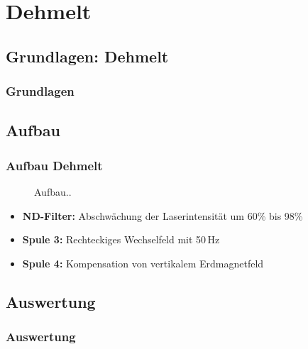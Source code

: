 
\section{Dehmelt}
\subsection{Grundlagen: Dehmelt}
\begin{frame}
\frametitle{Grundlagen}
  
\end{frame}

\subsection{Aufbau}
\begin{frame}
\frametitle{Aufbau Dehmelt}

\begin{figure}
    \centering
    \def\svgwidth{\textwidth}
    
    \caption{Aufbau..}
\end{figure}

\begin{itemize}
  \item \textbf{ND-Filter:} Abschwächung der Laserintensität um 60\% bis 98\%
  \item \textbf{Spule 3:} Rechteckiges Wechselfeld mit 50\,Hz
  \item \textbf{Spule 4:} Kompensation von vertikalem Erdmagnetfeld
\end{itemize}

\end{frame}

\subsection{Auswertung}
\begin{frame}
\frametitle{Auswertung}
  
\end{frame}